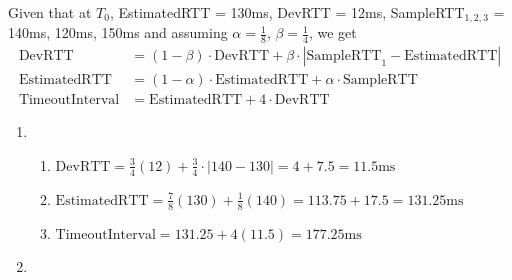 \documentclass{report}
\begin{document}
\begin{problem}
\begin{answer}{50em}
    Given that at $T_0$, EstimatedRTT = 130ms, DevRTT = 12ms, SampleRTT$_{1, 2, 3}$ = 140ms, 120ms, 
    150ms and assuming $\alpha = \frac{1}{8}$, $\beta = \frac{1}{4}$, we get
    \begin{align*}
        \text{DevRTT} &= (1 - \beta) \cdot \text{DevRTT} + \beta \cdot | \text{SampleRTT}_1 - \text{EstimatedRTT}| \\
        \text{EstimatedRTT} &= (1 - \alpha) \cdot \text{EstimatedRTT} + \alpha \cdot \text{SampleRTT} \\
        \text{TimeoutInterval} &= \text{EstimatedRTT} + 4 \cdot \text{DevRTT}
    \end{align*}
    \begin{enumerate}[label=\arabic*.]
        \item
            \begin{enumerate}[label=\textit{(\roman*)}]
                \item
                    $
                    \text{DevRTT} = \frac{3}{4} (12) + \frac{3}{4} \cdot |140 - 130|
                    = 4 + 7.5
                    = 11.5 \text{ms}
                    $
                \item 
                    $
                    \text{EstimatedRTT} = \frac{7}{8} (130) + \frac{1}{8} (140)
                    = 113.75 + 17.5
                    = 131.25 \text{ms}
                    $
                \item 
                    $
                    \text{TimeoutInterval} = 131.25 + 4(11.5)
                    = 177.25 \text{ms}
                    $
            \end{enumerate}
        \item
\end{enumerate}
\end{answer}
\end{problem}
\end{document}

